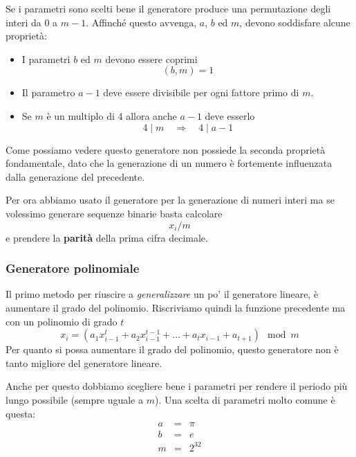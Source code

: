 Se i parametri sono scelti bene il generatore produce una permutazione degli interi da 0 a $m - 1$. Affinch\'e questo
avvenga, $a$, $b$ ed $m$, devono soddisfare alcune propriet\`a:
\begin{itemize}
	\item I parametri $b$ ed $m$ devono essere coprimi
	      \[ (b, m) = 1 \]
	\item Il parametro $a - 1$ deve essere divisibile per ogni fattore primo di $m$.
	\item Se $m$ \`e un multiplo di 4 allora anche $a-1$ deve esserlo
	      \[ 4 \mid m \quad \Rightarrow \quad 4 \mid a - 1 \]
\end{itemize}
Come possiamo vedere questo generatore non possiede la seconda propriet\`a fondamentale, dato che la generazione di un
numero \`e fortemente influenzata dalla generazione del precedente.

Per ora abbiamo usato il generatore per la generazione di numeri interi ma se volessimo generare sequenze binarie
basta calcolare
\[ x_i / m \]
e prendere la \textbf{parit\`a} della prima cifra decimale.

\subsubsection{Generatore polinomiale}
Il primo metodo per riuscire a \emph{generalizzare} un po' il generatore lineare, \`e aumentare il grado del polinomio.
Riscriviamo quindi la funzione precedente ma con un polinomio di grado $t$
\[ x_i = (a_1 x_{i-1}^t + a_2 x_{i-1}^{t-1} + \dots + a_t x_{i-1} + a_{t+1}) \mod{m} \]
Per quanto si possa aumentare il grado del polinomio, questo generatore non \`e tanto migliore del generatore lineare.

Anche per questo dobbiamo scegliere bene i parametri per rendere il periodo pi\`u lungo possibile (sempre uguale a $m$).
Una scelta di parametri molto comune \`e questa:
\[
	\begin{matrix}
		a & = & \pi    \\
		b & = & e      \\
		m & = & 2^{32}
	\end{matrix}
\]

